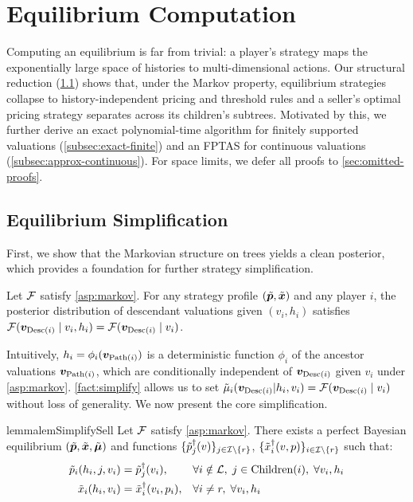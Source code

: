 \section{Equilibrium Computation}
\label{sec:algo}

Computing an equilibrium is far from trivial: a player's strategy maps the exponentially large space of histories to multi-dimensional actions. Our structural reduction (\cref{subsec:simplification}) shows that, under the Markov property, equilibrium strategies collapse to history-independent pricing and threshold rules and a seller's optimal pricing strategy separates across its children's subtrees. Motivated by this, we further derive an exact polynomial-time algorithm for finitely supported valuations (\cref{subsec:exact-finite}) and an FPTAS for continuous valuations (\cref{subsec:approx-continuous}).
For space limits, we defer all proofs to \cref{sec:omitted-proofs}.

\subsection{Equilibrium Simplification}
\label{subsec:simplification}

First, we show that the Markovian structure on trees yields a clean posterior, which provides a foundation for further strategy simplification.

\begin{fact}
\label{fact:simplify}
Let $\mathcal{F}$ satisfy \cref{asp:markov}. For any strategy profile $(\tilde{{\bm{p}}}, \tilde{{\bm{x}}})$ and any player $i$, the posterior distribution of descendant valuations given $(v_i, h_i)$ satisfies $\mathcal{F}({\bm{v}}_{\operatorname{Desc}(i)} \mid v_i, h_i) = \mathcal{F}({\bm{v}}_{\operatorname{Desc}(i)} \mid v_i)$.
\end{fact}

Intuitively, $h_i = \phi_i({\bm{v}}_{\operatorname{Path}(i)})$ is a deterministic function $\phi_i$ of the ancestor valuations ${\bm{v}}_{\operatorname{Path}(i)}$, which are conditionally independent of ${\bm{v}}_{\operatorname{Desc}(i)}$ given $v_i$ under \cref{asp:markov}.
\cref{fact:simplify} allows us to set ${\tilde{\mu}}_i({\bm{v}}_{\operatorname{Desc}(i)}|h_i,v_i) = \mathcal{F}({\bm{v}}_{\operatorname{Desc}(i)} \mid v_i)$ without loss of generality.
We now present the core simplification.

\begin{restatable}{lemma}{lemSimplifySell}
\label{lem:simplify-sell}
Let $\mathcal{F}$ satisfy \cref{asp:markov}.
There exists a perfect Bayesian equilibrium $(\tilde{{\bm{p}}}, \tilde{{\bm{x}}}, {\tilde{{\bm{\mu}}}})$ and functions $\{\tilde{p}^\dagger_j(v)\}_{j \in \mathcal{I} \setminus \{r\}}$, $\{\tilde{x}^\dagger_i(v,p)\}_{i \in \mathcal{I} \setminus \{r\}}$ such that:
\begin{equation}
\label{eq:lem:simplify-sell}
\begin{aligned}
\tilde{p}_i(h_i, j, v_i) &= \tilde{p}^\dagger_j(v_i), &&\forall i \notin \mathcal{L},\; j \in \operatorname{Children}(i),\; \forall v_i, h_i \\
\tilde{x}_i(h_i, v_i) &= \tilde{x}^\dagger_i(v_i, p_i), &&\forall i \neq r,\; \forall v_i, h_i
\end{aligned}
\end{equation}
\end{restatable}

